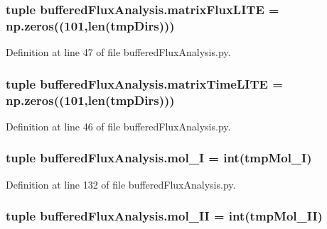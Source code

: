 \hypertarget{namespacebuffered_flux_analysis_a160e0d0c0c7cff8f8a141429c1235eb8}{
\subsubsection[{matrix\-Flux\-L\-I\-T\-E}]{\setlength{\rightskip}{0pt plus 5cm}tuple buffered\-Flux\-Analysis.\-matrix\-Flux\-L\-I\-T\-E = np.\-zeros((101,len({\bf tmp\-Dirs})))}}\label{namespacebuffered_flux_analysis_a160e0d0c0c7cff8f8a141429c1235eb8}


Definition at line 47 of file buffered\-Flux\-Analysis.\-py.

\hypertarget{namespacebuffered_flux_analysis_a620ce4d1c541ead7668e3872c011a35c}{
\subsubsection[{matrix\-Time\-L\-I\-T\-E}]{\setlength{\rightskip}{0pt plus 5cm}tuple buffered\-Flux\-Analysis.\-matrix\-Time\-L\-I\-T\-E = np.\-zeros((101,len({\bf tmp\-Dirs})))}}\label{namespacebuffered_flux_analysis_a620ce4d1c541ead7668e3872c011a35c}


Definition at line 46 of file buffered\-Flux\-Analysis.\-py.

\hypertarget{namespacebuffered_flux_analysis_a64e0bf7f508f99df9f78726bb69f39fc}{
\subsubsection[{mol\-\_\-\-I}]{\setlength{\rightskip}{0pt plus 5cm}tuple buffered\-Flux\-Analysis.\-mol\-\_\-\-I = int(tmp\-Mol\-\_\-\-I)}}\label{namespacebuffered_flux_analysis_a64e0bf7f508f99df9f78726bb69f39fc}


Definition at line 132 of file buffered\-Flux\-Analysis.\-py.

\hypertarget{namespacebuffered_flux_analysis_a608780773cb877189c0d288e25bbc3f3}{
\subsubsection[{mol\-\_\-\-I\-I}]{\setlength{\rightskip}{0pt plus 5cm}tuple buffered\-Flux\-Analysis.\-mol\-\_\-\-I\-I = int(tmp\-Mol\-\_\-\-I\-I)}}\label{namespacebuffered_flux_analysis_a608780773cb877189c0d288e25bbc3f3}


